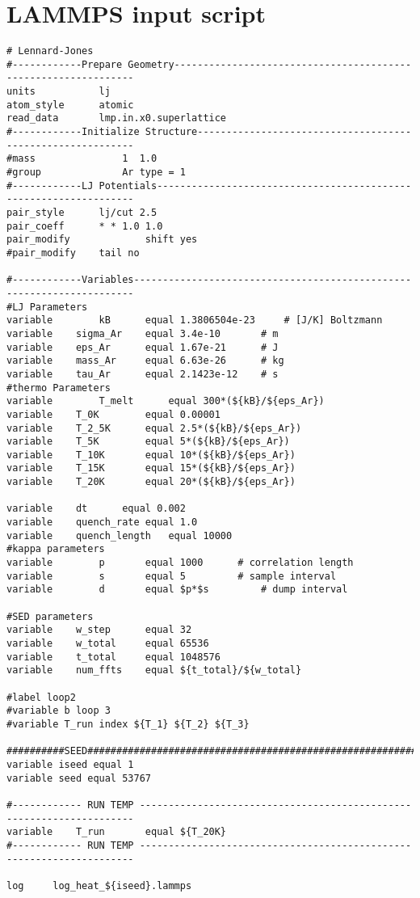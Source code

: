 \chapter{LAMMPS input script}
\begin{singlespace}
\begin{verbatim}
# Lennard-Jones
#------------Prepare Geometry---------------------------------------------------------------
units			lj
atom_style		atomic
read_data		lmp.in.x0.superlattice
#------------Initialize Structure-----------------------------------------------------------
#mass           	1  1.0
#group         		Ar type = 1
#------------LJ Potentials------------------------------------------------------------------
pair_style		lj/cut 2.5
pair_coeff		* * 1.0 1.0
pair_modify          	shift yes
#pair_modify   	tail no

#------------Variables----------------------------------------------------------------------
#LJ Parameters
variable    	kB 		equal 1.3806504e-23 	# [J/K] Boltzmann
variable	sigma_Ar 	equal 3.4e-10 		# m
variable	eps_Ar		equal 1.67e-21		# J
variable	mass_Ar		equal 6.63e-26		# kg
variable	tau_Ar		equal 2.1423e-12	# s
#thermo Parameters
variable    	T_melt 		equal 300*(${kB}/${eps_Ar})
variable	T_0K		equal 0.00001
variable	T_2_5K		equal 2.5*(${kB}/${eps_Ar})
variable	T_5K		equal 5*(${kB}/${eps_Ar})
variable	T_10K		equal 10*(${kB}/${eps_Ar})
variable	T_15K		equal 15*(${kB}/${eps_Ar})
variable	T_20K		equal 20*(${kB}/${eps_Ar})

variable   	dt 		equal 0.002
variable	quench_rate	equal 1.0
variable	quench_length 	equal 10000
#kappa parameters
variable    	p 		equal 1000 		# correlation length
variable    	s 		equal 5  		# sample interval
variable    	d 		equal $p*$s 		# dump interval 

#SED parameters
variable	w_step		equal 32		
variable	w_total		equal 65536
variable	t_total		equal 1048576
variable	num_ffts	equal ${t_total}/${w_total}

#label loop2
#variable b loop 3
#variable T_run index ${T_1} ${T_2} ${T_3}

##########SEED##########################################################
variable iseed equal 1
variable seed equal 53767 	

#------------ RUN TEMP ---------------------------------------------------------------------	
variable 	T_run 		equal ${T_20K}
#------------ RUN TEMP ---------------------------------------------------------------------	

log 	log_heat_${iseed}.lammps


\end{verbatim}
\end{singlespace}
